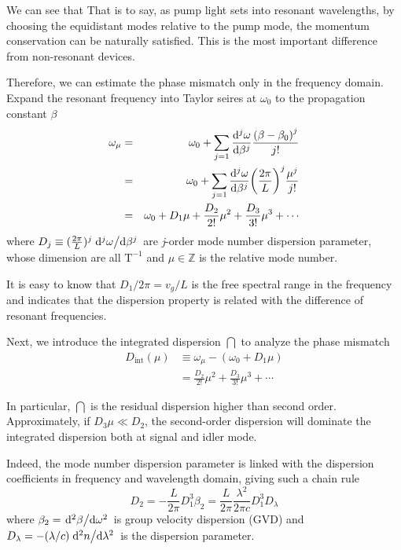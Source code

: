 We can see that  That is to say, as pump light sets into resonant wavelengths, by choosing the equidistant modes relative to the pump mode, the momentum conservation can be naturally satisfied. This is the most important difference from non-resonant devices.

Therefore, we can estimate the phase mismatch only in the frequency domain. Expand the resonant frequency into Taylor seires at $\omega_0$ to the propagation constant $\beta$
\begin{eqnarray}\label{eq:omega-taylor}
  \omega_{\mu} & = & \omega_0 
  + \sum_{j=1}\dv[j]{\omega}{\beta} (\beta_{\mu}-\beta_0) \frac{{(\beta-\beta_0)}^j}{j!} \\
  & = & \omega_0 
  + \sum_{j=1}\dv[j]{\omega}{\beta} \qty(\frac{2 \pi}{L})^j \frac{\mu^j}{j!} \nonumber \\
  & = & \omega_0 + D_1 \mu + \frac{D_2}{2!} \mu^2 + \frac{D_3}{3!} \mu^3 + \cdots \nonumber
\end{eqnarray}
where $D_j \equiv  (\frac{2 \pi}{L})^j\dv*[j]{\omega}{\beta}$ are \textit{j}-order mode number dispersion parameter, whose dimension are all $\mathrm{T}^{-1}$ and $\mu \in \mathbb{Z}$ is the relative mode number. 

It is easy to know that $D_1 / 2 \pi = v_g / L$ is the free spectral range in the frequency and indicates that the dispersion property is related with the difference of resonant frequencies.   

Next, we introduce the integrated dispersion $\dint$ \cite{Brasch2014a} to analyze the phase mismatch
\begin{align}\label{eq:def-dint}
    D_\mathrm{int}(\mu) &\equiv \omega_{\mu} - (\omega_0 + D_1 \mu)  \\
    &= \frac{D_2}{2!} \mu^2 + \frac{D_3}{3!} \mu^3 + \cdots \nonumber
\end{align}

In particular, $\dint$ is the residual dispersion higher than second order. Approximately, if $D_3 \mu \ll D_2$, the second-order dispersion will dominate the integrated dispersion both at signal and idler mode.

Indeed, the mode number dispersion parameter is linked with the dispersion coefficients in frequency and wavelength domain, giving such a chain rule
\begin{equation}\label{eq:disp-chain}
    D_2 = - \frac{L}{2\pi} {D_1^3}{\beta_2} = \frac{L}{2\pi}  \frac{\lambda^2}{2\pi c} {D_1^3} D_{\lambda}
\end{equation}
where $\beta_2=\dv*[2]{\beta}{\omega}$ is group velocity dispersion (GVD) and $D_{\lambda}= - (\lambda/c)\dv*[2]{n}{\lambda}$ is the dispersion parameter.

